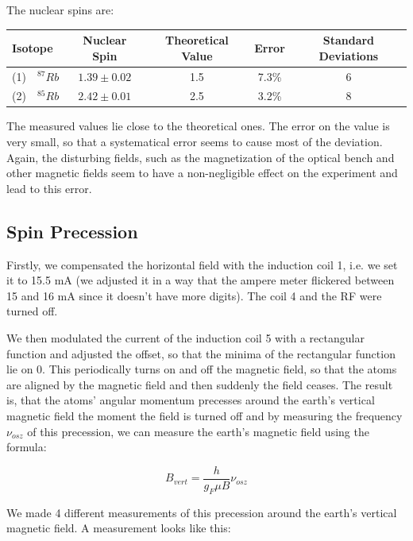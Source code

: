 The nuclear spins are:

\begin{center}
\begin{tabular}[H]{| l c c c c |}\hline
Isotope & Nuclear Spin & Theoretical Value & Error & Standard Deviations \\ \hline
(1)\ \ $^{87}Rb$ & $1.39 \pm 0.02$ & 1.5 & 7.3\% & 6 \\
(2)\ \ $^{85}Rb$ & $2.42 \pm 0.01$ & 2.5 & 3.2\% & 8\\  \hline
\end{tabular}
\end{center}

The measured values lie close to the theoretical ones. The error on the value is very small, so that a systematical error seems to cause most of the deviation. Again, the disturbing fields, such as the magnetization of the optical bench and other magnetic fields seem to have a non-negligible effect on the experiment and lead to this error.


\clearpage
\subsection{Spin Precession}

Firstly, we compensated the horizontal field with the induction coil 1, i.e. we set it to 15.5 mA (we adjusted it in a way that the ampere meter flickered between 15 and 16 mA since it doesn't have more digits). The coil 4 and the RF were turned off.

We then modulated the current of the induction coil 5 with a rectangular function and adjusted the offset, so that the minima of the rectangular function lie on 0. This periodically turns on and off the magnetic field, so that the atoms are aligned by the magnetic field and then suddenly the field ceases. The result is, that the atoms' angular momentum precesses around the earth's vertical magnetic field the moment the field is turned off and by measuring the frequency $\nu_{osz}$ of this precession, we can measure the earth's magnetic field using the formula:

$$ B_{vert} = \frac{h}{g_F\mu B}\nu_{osz} $$

We made 4 different measurements of this precession around the earth's vertical magnetic field. A measurement looks like this:

